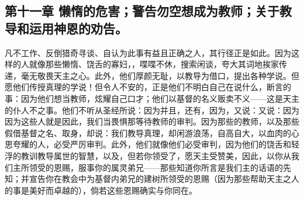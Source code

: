 
\subsection{第十一章 懒惰的危害；警告勿空想成为教师；关于教导和运用神恩的劝告。}

凡不工作、反倒猎奇寻谈、自认为此事有益且正确之人，其行径正是如此。因为这样的人就像那些懒惰、饶舌的寡妇，，喋喋不休，搜索闲谈，夸大其词地挨家传递，毫无敬畏天主之心。此外，他们厚颜无耻，以教导为借口，提出各种学说。但愿他们传授真理的学说！但令人不安的，正是他们不明白自己在说什么，断言的事：因为他们想当教师，炫耀自己口才；他们以基督的名义贩卖不义——这是天主的仆人不之事。他们不听从圣经所说：因为并且，还有，因为，又说：又说：因为因为这些人就是因此，我们当畏惧那等待教师的审判。因为那些的教师，以及那些假借基督之名、取身，却说：我们教导真理，却闲游浪荡，自高自大，以血肉的心思夸耀的人，必受严厉审判。此外，他们就像他们必受审判，因为他们的饶舌和轻浮的教训教导属世的智慧，以及，但若你领受了，愿天主受赞美，因此，以你从我们主所领受的恩赐，服事你的属灵弟兄——那些知道你所言是我们主的话语的先知；并宣告你在教会中为基督内弟兄的建树所领受的恩赐（因为那些帮助天主之人的事是美好而卓越的），倘若这些恩赐确实与你同在。\par

